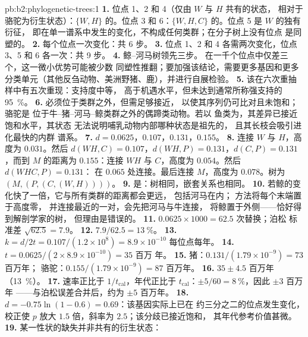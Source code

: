 \begin{solution}{pb:b2:phylogenetic-trees:1}
\textbf{1.} 位点 1、2 和 4（仅由 $W$ 与 $H$ 共有的状态，
相对于骆驼为衍生状态）：$\{W,H\}$ 的。位点 3
和 6：$\{W,H,C\}$ 的。位点 5 是 $W$ 的独有衍征，
即在单一谱系中发生的变化，不构成任何类群；在分子树上没有位点
是同塑的。
\textbf{2.} 每个位点一次变化：共 6 步。
\textbf{3.} 位点 1、2 和 4 各需两次变化，位点 3、5
和 6 各一次：共 9 步。
\textbf{4.} 鲸–河马树领先三步。
在一千个位点中仅差三个，这一微小优势可能被少数
同塑性推翻；要加强该结论，需要更多基因和更多
分类单元（其他反刍动物、美洲野猪、鹿），并进行自展检验。
\textbf{5.} 该在六次重抽样中有五次重现：支持度中等，
高于机遇水平，但未达到通常所称强支持的
\qty{95}{\%}。
\textbf{6.} 必须位于类群之外，但需足够接近，
以使其序列仍可比对且未饱和；骆驼是
位于牛–猪–河马–鲸类群之外的偶蹄类动物。若以
鱼类为，其差异已接近饱和水平，其状态
无法说明哺乳动物内部哪种状态是祖先的，
且其长枝会吸引进化最快的内群
谱系。
\textbf{7.} $d = 0.0625$，$0.107$，$0.131$，$0.155$。
\textbf{8.} 连接 $W$ 与 $H$，高度为 $0.031$。然后 $d(WH,C) =
0.107$，$d(WH,P) = 0.131$，$d(C,P) = 0.131$，而到 $M$ 的距离为
$0.155$：连接 $WH$ 与 $C$，高度为 $0.054$。然后 $d(WHC,P) = 0.131$：
在 $0.065$ 处连接。最后连接 $M$，高度为 $0.078$。树为 $(M,(P,(C,(W,H))))$。
\textbf{9.} 是：树相同，嵌套关系也相同。
\textbf{10.} 若鲸的变化快了一倍，它与所有类群的距离都会更远，
包括河马在内； 方法将每个末端置于高度零，
并连接最近的一对，会先把河马与牛连接，
将鲸置于外侧——恰好得到解剖学家的树，
但理由是错误的。
\textbf{11.} $0.0625\times 1000 = 62.5$ 次替换；泊松
标准差 $\sqrt{62.5} = 7.9$。
\textbf{12.} $7.9/62.5 = \qty{13}{\%}$。
\textbf{13.} $k = d/2t = 0.107/(1.2\times 10^{8}) = 8.9\times 10^{-10}$
每位点每年。
\textbf{14.} $t = 0.0625/(2\times 8.9\times 10^{-10}) = 35$ 百万
年。
\textbf{15.} 猪：$0.131/(1.79\times 10^{-9}) = 73$ 百万年；
骆驼：$0.155/(1.79\times 10^{-9}) = 87$ 百万年。
\textbf{16.} $35 \pm 4.5$ 百万年（\qty{13}{\%}）。
\textbf{17.} 速率正比于 $1/t_{\text{cal}}$，年代正比于
$t_{\text{cal}}$：$\pm 5/60 = \qty{8}{\%}$，因此 $\pm 3$ 百万年
——与泊松误差合并后，约为 $\pm 5$ 百万年。
\textbf{18.} $d = -0.75\ln(1 - 0.6) = 0.69$：该基因实际上已在
约三分之二的位点发生变化，校正使
$p$ 放大 $1.5$ 倍，斜率为 $2.5$；该分歧已接近饱和，
其年代参考价值甚微。
\textbf{19.} 某一性状的缺失并非共有的衍生状态：

\end{solution}
